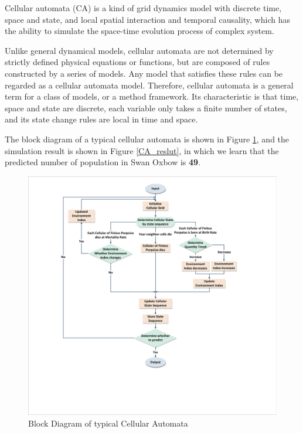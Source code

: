 \documentclass{mcmthesis}
\numberwithin{figure}{section}
\numberwithin{table}{section}
\numberwithin{equation}{section}
\begin{document}
Cellular automata (CA) is a kind of grid dynamics model with discrete time, 
space and state, and local spatial interaction and temporal causality, which 
has the ability to simulate the space-time evolution process of complex system.
\par
Unlike general dynamical models, cellular automata are not determined by strictly 
defined physical equations or functions, but are composed of rules constructed by 
a series of models. Any model that satisfies these rules can be regarded as a cellular 
automata model. Therefore, cellular automata is a general term for a class of models, 
or a method framework. Its characteristic is that time, space and state are discrete, 
each variable only takes a finite number of states, and its state change rules are local 
in time and space.
\par
The block diagram of a typical cellular automata is shown in Figure \ref{CA_Fig}, 
and the simulation result is shown in Figure \ref{CA_reslut}, in which
we learn that the predicted number of population in Swan Oxbow is \textbf{49}.


\begin{figure}[htbp]
  \centering
  \includegraphics[width = 14cm]{codes/元胞自动机流程图.pdf}
  \caption{Block Diagram of typical Cellular Automata}\label{CA_Fig}
\end{figure}
\end{document}
